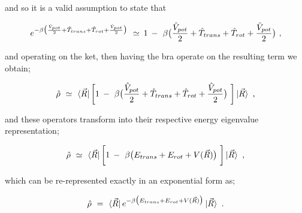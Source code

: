 \documentclass[11pt]{article}
\begin{document}
and so it is a valid assumption to state that

\begin{equation} \label{wr-eq-41-1}
e^{- \beta \big( \frac{\hat{V}_{pot}}{2} + \hat{T}_{trans} + \hat{T}_{rot} + \frac{\hat{V}_{pot}}{2} \big) } \hspace{0.125cm} \simeq \hspace{0.075cm} 1 \hspace{0.075cm} - \hspace{0.125cm} \beta \big( \frac{\hat{V}_{pot}}{2} + \hat{T}_{trans} + \hat{T}_{rot} + \frac{\hat{V}_{pot}}{2} \big) \hspace{0.125cm} ,
\end{equation}

and operating on the ket, then having the bra operate on the resulting term we obtain;

\begin{equation} \label{wr-eq-42-1}
\hat{\rho} \hspace{0.125cm} \simeq \hspace{0.125cm} \bra{\vec{R}} \bigg[ 1 \hspace{0.075cm} - \hspace{0.125cm} \beta \big( \frac{\hat{V}_{pot}}{2} + \hat{T}_{trans} + \hat{T}_{rot} + \frac{\hat{V}_{pot}}{2} \big) \hspace{0.125cm} \bigg] \ket{\vec{R}} \hspace{0.125cm} ,
\end{equation}

and these operators transform into their respective energy eigenvalue representation;

\begin{equation} \label{wr-eq-43-1}
\hat{\rho} \hspace{0.125cm} \simeq \hspace{0.125cm} \bra{\vec{R}} \bigg[ 1 \hspace{0.075cm} - \hspace{0.125cm} \beta \big( E_{trans} + E_{rot} + V(\vec{R})\big) \hspace{0.125cm} \bigg] \ket{\vec{R}} \hspace{0.125cm} ,
\end{equation}

which can be re-represented exactly in an exponential form as;

\begin{equation} \label{wr-eq-44-1}
\hat{\rho} \hspace{0.125cm} = \hspace{0.125cm} \bra{\vec{R}} e^{ - \beta \big( E_{trans} + E_{rot} + V(\vec{R})\big)} \ket{\vec{R}} \hspace{0.125cm} .
\end{equation}
\end{document}
